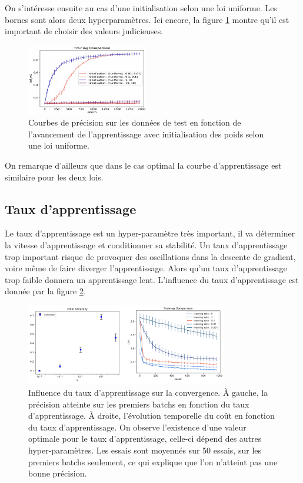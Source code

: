 On s'intéresse ensuite au cas d'une initialisation selon une loi uniforme. Les bornes sont alors deux hyperparamètres. Ici encore, la figure \ref{MLP_inituni} montre qu'il est important de choisir des valeurs judicieuses.


\begin{figure}[!h]
\centering
\includegraphics[width=150pt]{"images/MLP/MLP_inituni"}
\caption{Courbes de précision sur les données de test en fonction de l'avancement de l'apprentissage avec initialisation des poids selon une loi uniforme.}
\label{MLP_inituni}
\end{figure}

On remarque d'ailleurs que dans le cas optimal la courbe d'apprentissage est similaire pour les deux lois.

\subsection{Taux d'apprentissage}
Le taux d'apprentissage est un hyper-paramètre très important, il va déterminer la vitesse d'apprentissage et conditionner sa stabilité. Un taux d'apprentissage trop important risque de provoquer des oscillations dans la descente de gradient, voire même de faire diverger l'apprentissage. Alors qu'un taux d'apprentissage trop faible donnera un apprentissage lent. L'influence du taux d'apprentissage est donnée par la figure \ref{taux_app}.

\begin{figure}[!h]
\centering
\includegraphics[width=250pt]{"images/MLP/taux_app"}
\caption{Influence du taux d'apprentissage sur la convergence. À gauche, la précision atteinte sur les premiers batchs en fonction du taux d'apprentissage. À droite, l'évolution temporelle du coût en fonction du taux d'apprentissage. On observe l'existence d'une valeur optimale pour le taux d'apprentissage, celle-ci dépend des autres hyper-paramètres. Les essais sont moyennés sur 50 essais, sur les premiers batchs seulement, ce qui explique que l'on n'atteint pas une bonne précision.}
\label{taux_app}
\end{figure}